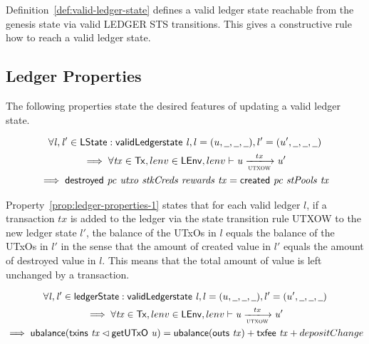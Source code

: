 Definition~\ref{def:valid-ledger-state} defines a valid ledger state reachable
from the genesis state via valid LEDGER STS transitions. This gives a
constructive rule how to reach a valid ledger state.

\subsection{Ledger Properties}
\label{sec:ledger-properties}

The following properties state the desired features of updating a valid ledger
state.

\begin{property}
  \begin{multline*}
    \forall \var{l}, \var{l'} \in \LState: \applyFun{validLedgerstate}{l},
    l=(u,\wcard,\wcard,\wcard), l' = (u',\wcard,\wcard,\wcard)\\
    \implies \forall \var{tx} \in \Tx, lenv \in\LEnv, lenv \vdash\var{u} \trans{utxow}{tx} \var{u'} \\
    \implies \applyFun{destroyed}{pc~utxo~stkCreds~rewards~tx} =
    \applyFun{created}{pc~stPools~tx}
  \end{multline*}
  \label{prop:ledger-properties-1}
\end{property}

Property~\ref{prop:ledger-properties-1} states that for each valid ledger $l$,
if a transaction $tx$ is added to the ledger via the state transition rule UTXOW
to the new ledger state $l'$, the balance of the UTxOs in $l$ equals the balance
of the UTxOs in $l'$ in the sense that the amount of created value in $l'$
equals the amount of destroyed value in $l$. This means that the total amount of
value is left unchanged by a transaction.

\begin{property}
  \begin{multline*}
    \forall \var{l}, \var{l'} \in \ledgerState: \applyFun{validLedgerstate}{l},
    l=(u,\wcard,\wcard,\wcard), l' = (u',\wcard,\wcard,\wcard)\\
    \implies \forall \var{tx} \in \Tx, lenv \in\LEnv, lenv \vdash \var{u}
    \trans{utxow}{tx} \var{u'} \\
    \implies \fun{ubalance}(\applyFun{txins}{tx} \restrictdom
    \applyFun{getUTxO}{u}) = \fun{ubalance}(\applyFun{outs}{tx}) +
    \applyFun{txfee}{tx} + depositChange
  \end{multline*}
  \label{prop:ledger-properties-2}
\end{property}

